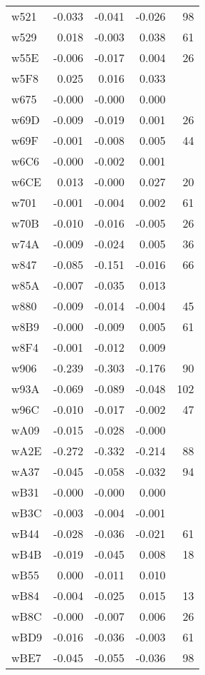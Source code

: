 \begin{table}[ht]
\begin{tabular}{lrrrr}
  w521 & -0.033 & -0.041 & -0.026 &   98 \\ 
  w529 & 0.018 & -0.003 & 0.038 &   61 \\ 
  w55E & -0.006 & -0.017 & 0.004 &   26 \\ 
  w5F8 & 0.025 & 0.016 & 0.033 &  \\ 
  w675 & -0.000 & -0.000 & 0.000 &  \\ 
  w69D & -0.009 & -0.019 & 0.001 &   26 \\ 
  w69F & -0.001 & -0.008 & 0.005 &   44 \\ 
  w6C6 & -0.000 & -0.002 & 0.001 &  \\ 
  w6CE & 0.013 & -0.000 & 0.027 &   20 \\ 
  w701 & -0.001 & -0.004 & 0.002 &   61 \\ 
  w70B & -0.010 & -0.016 & -0.005 &   26 \\ 
  w74A & -0.009 & -0.024 & 0.005 &   36 \\ 
  w847 & -0.085 & -0.151 & -0.016 &   66 \\ 
  w85A & -0.007 & -0.035 & 0.013 &  \\ 
  w880 & -0.009 & -0.014 & -0.004 &   45 \\ 
  w8B9 & -0.000 & -0.009 & 0.005 &   61 \\ 
  w8F4 & -0.001 & -0.012 & 0.009 &  \\ 
  w906 & -0.239 & -0.303 & -0.176 &   90 \\ 
  w93A & -0.069 & -0.089 & -0.048 &  102 \\ 
  w96C & -0.010 & -0.017 & -0.002 &   47 \\ 
  wA09 & -0.015 & -0.028 & -0.000 &  \\ 
  wA2E & -0.272 & -0.332 & -0.214 &   88 \\ 
  wA37 & -0.045 & -0.058 & -0.032 &   94 \\ 
  wB31 & -0.000 & -0.000 & 0.000 &  \\ 
  wB3C & -0.003 & -0.004 & -0.001 &  \\ 
  wB44 & -0.028 & -0.036 & -0.021 &   61 \\ 
  wB4B & -0.019 & -0.045 & 0.008 &   18 \\ 
  wB55 & 0.000 & -0.011 & 0.010 &  \\ 
  wB84 & -0.004 & -0.025 & 0.015 &   13 \\ 
  wB8C & -0.000 & -0.007 & 0.006 &   26 \\ 
  wBD9 & -0.016 & -0.036 & -0.003 &   61 \\ 
  wBE7 & -0.045 & -0.055 & -0.036 &   98 \\ 

\end{tabular}
\end{table}
